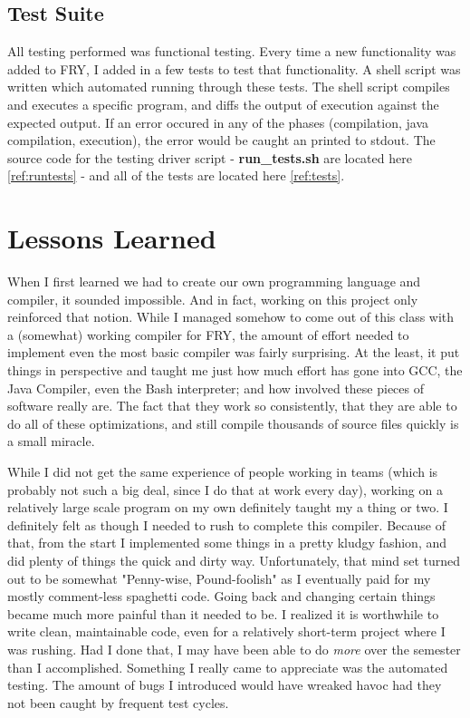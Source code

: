 \documentclass{article}
\begin{document}
\subsection{Test Suite}
All testing performed was functional testing. Every time a new functionality was added to FRY, I added in a few tests to test that functionality. A shell script was written which automated running through these tests. The shell script compiles and executes a specific program, and diffs the output of execution against the expected output. If an error occured in any of the phases (compilation, java compilation, execution), the error would be caught an printed to stdout. The source code for the testing driver script - \textbf{run\_tests.sh} are located here \ref{ref:runtests} - and all of the tests are located here \ref{ref:tests}.

\section{Lessons Learned}

When I first learned we had to create our own programming language and compiler, it sounded impossible. And in fact, working on this project only reinforced that notion. While I managed somehow to come out of this class with a (somewhat) working compiler for FRY, the amount of effort needed to implement even the most basic compiler was fairly surprising. At the least, it put things in perspective and taught me just how much effort has gone into GCC, the Java Compiler, even the Bash interpreter; and how involved these pieces of software really are. The fact that they work so consistently, that they are able to do all of these optimizations, and still compile thousands of source files quickly is a small miracle. 

While I did not get the same experience of people working in teams (which is probably not such a big deal, since I do that at work every day), working on a relatively large scale program on my own definitely taught my a thing or two. I definitely felt as though I needed to rush to complete this compiler. Because of that, from the start I implemented some things in a pretty kludgy fashion, and did plenty of things the quick and dirty way. Unfortunately, that mind set turned out to be somewhat "Penny-wise, Pound-foolish" as I eventually paid for my mostly comment-less spaghetti code. Going back and changing certain things became much more painful than it needed to be. I realized it is worthwhile to write clean, maintainable code, even for a relatively short-term project where I was rushing. Had I done that, I may have been able to do \emph{more} over the semester than I accomplished. Something I really came to appreciate was the automated testing. The amount of bugs I introduced would have wreaked havoc had they not been caught by frequent test cycles. 
\end{document}
